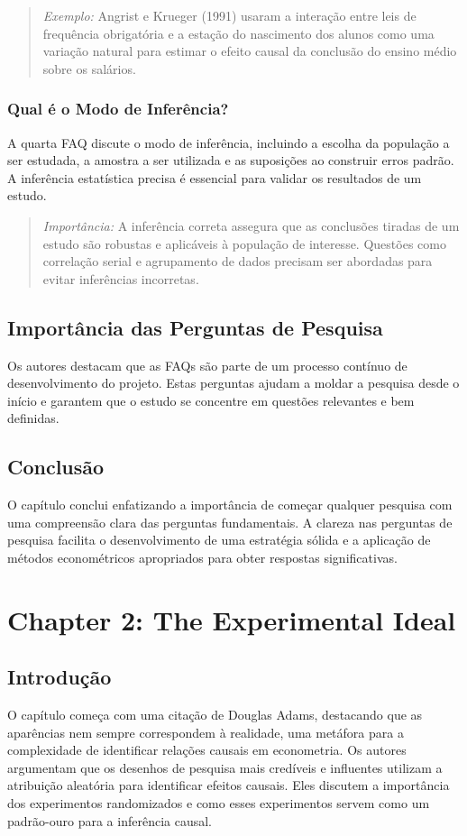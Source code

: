 \documentclass[a4paper,12pt]{article}[abntex2]
\begin{document}
\begin{quote}
\textit{Exemplo:} Angrist e Krueger (1991) usaram a interação entre leis de frequência obrigatória e a estação do nascimento dos alunos como uma variação natural para estimar o efeito causal da conclusão do ensino médio sobre os salários.
\end{quote}

\subsubsection{Qual é o Modo de Inferência?}
A quarta FAQ discute o modo de inferência, incluindo a escolha da população a ser estudada, a amostra a ser utilizada e as suposições ao construir erros padrão. A inferência estatística precisa é essencial para validar os resultados de um estudo.

\begin{quote}
\textit{Importância:} A inferência correta assegura que as conclusões tiradas de um estudo são robustas e aplicáveis à população de interesse. Questões como correlação serial e agrupamento de dados precisam ser abordadas para evitar inferências incorretas.
\end{quote}

\subsection{Importância das Perguntas de Pesquisa}
Os autores destacam que as FAQs são parte de um processo contínuo de desenvolvimento do projeto. Estas perguntas ajudam a moldar a pesquisa desde o início e garantem que o estudo se concentre em questões relevantes e bem definidas.

\subsection{Conclusão}
O capítulo conclui enfatizando a importância de começar qualquer pesquisa com uma compreensão clara das perguntas fundamentais. A clareza nas perguntas de pesquisa facilita o desenvolvimento de uma estratégia sólida e a aplicação de métodos econométricos apropriados para obter respostas significativas.

\newpage

\section{Chapter 2: The Experimental Ideal}

\subsection{Introdução}
O capítulo começa com uma citação de Douglas Adams, destacando que as aparências nem sempre correspondem à realidade, uma metáfora para a complexidade de identificar relações causais em econometria. Os autores argumentam que os desenhos de pesquisa mais credíveis e influentes utilizam a atribuição aleatória para identificar efeitos causais. Eles discutem a importância dos experimentos randomizados e como esses experimentos servem como um padrão-ouro para a inferência causal.
\end{document}

